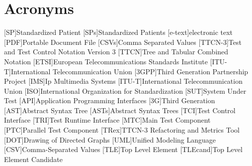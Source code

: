 \section*{Acronyms}
\begin{acronym}
\setlength{\itemsep}{-\parsep} 
[SP]{Standardized Patient}
[SPs]{Standardized Patients}
[e-text]{electronic text}
[PDF]{Portable Document File}
[CSVs]{Comma Separated Values }
[TTCN-3]{Test and Test Control Notation Version 3}
[TTCN]{Tree and Tabular Combined Notation}
[ETSI]{European Telecommunications Standards Institute}
[ITU-T]{International Telecommunication Union}
[3GPP]{Third Generation Partnership Project}
[IMS]{Ip Multimedia Systems}
[ITU-T]{International Telecommunication Union}
[ISO]{International Organization for Standardization}
[SUT]{System Under Test}
[API]{Application Programming Interfaces}
[3G]{Third Generation}
[AST]{Abstract Syntax Tree}
[ASTs]{Abstract Syntax Trees}
[TCI]{Test Control Interface}
[TRI]{Test Runtime Interface}
[MTC]{Main Test Component}
[PTC]{Parallel Test Component}
[TRex]{TTCN-3 Refactoring and Metrics Tool}
[DOT]{Drawing of Directed Graphs}
[UML]{Unified Modeling Language}
[CSV]{Comma-Separated Values}
[TLE]{Top Level Element}
[TLEcand]{Top Level Element Candidate}
\end{acronym}
